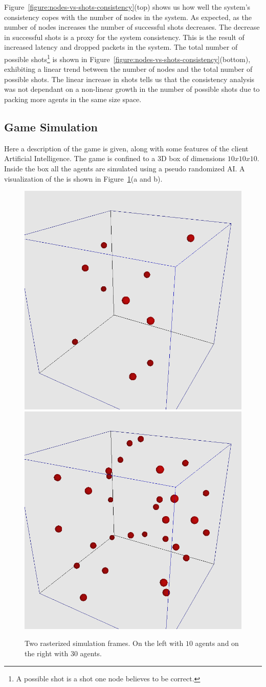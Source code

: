 Figure~\ref{figure:nodes-vs-shots-consistency}(top) shows us how well the system's consistency copes with the number of nodes in the system.
As expected, as the number of nodes increases the number of successful shots decreases.
The decrease in successful shots is a proxy for the system consistency. 
This is the result of increased latency and dropped packets in the system. 
The total number of possible shots\footnote{A possible shot is a shot one node believes to be correct.} is shown in Figure~\ref{figure:nodes-vs-shots-consistency}(bottom), exhibiting a linear trend between the number of nodes and the total number of possible shots.
The linear increase in shots tells us that the consistency analysis was not dependant on a non-linear growth in the number of possible shots due to packing more agents in the same size space.

\subsection{Game Simulation}

Here a description of the game is given, along with some features of the client Artificial Intelligence. The game is confined to a 3D box of dimensions $10x10x10$. Inside the box all the agents are simulated using a pseudo randomized AI. A visualization of the \gamestate is shown in Figure~\ref{figure:game-renders}(a and b).

\begin{figure}[htb!]
\centering
	\includegraphics[width=0.45\linewidth]{../images/10-agents-render.png}
	\includegraphics[width=0.45\linewidth]{../images/30-agents-render.png}	

	\caption{\label{figure:game-renders} Two rasterized simulation frames. On the left with $10$ agents and on the right with $30$ agents.}
\end{figure}

